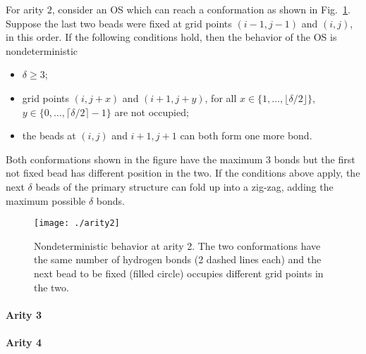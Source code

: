 \documentclass[]{llncs}
\begin{document}
For arity $2$, consider an OS which can reach a conformation as shown in Fig.~\ref{fig:arity2}. Suppose the last two beads were fixed at grid points $(i-1,j-1)$ and $(i,j)$, in this order. If the following conditions hold, then the behavior of the OS is nondeterministic
\begin{itemize}
\item $\delta\geq 3$;
\item grid points $(i,j+x)$ and $(i+1,j+y)$, for all $x\in \{1,\dots,\lfloor \delta/2\rfloor\}$, $y\in \{0,\dots,\lceil\delta/2\rceil-1\}$ are not occupied;
\item the beads at $(i,j)$ and $i+1,j+1$ can both form one more bond.
\end{itemize}
Both conformations shown in the figure have the maximum $3$ bonds but the first not fixed bead has different position in the two. If the conditions above apply, the next $\delta$ beads of the primary structure can fold up into a zig-zag, adding the maximum possible $\delta$ bonds.




\begin{figure}
\centering
\texttt{[image: ./arity2]}
\caption{Nondeterministic behavior at arity 2. The two conformations have the same number of hydrogen bonds (2 dashed lines each) and the next bead to be fixed (filled circle) occupies different grid points in the two.}
\label{fig:arity2}
\end{figure}


\paragraph{Arity 3}


\paragraph{Arity 4}





\end{document}
